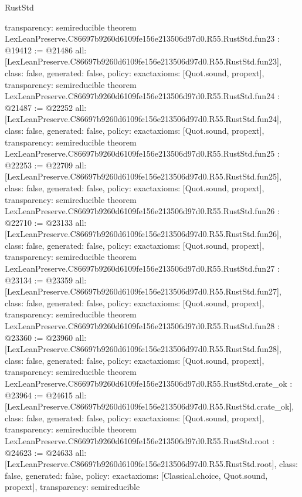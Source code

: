 \begin{lexlean}{RustStd}
\begin{coremodule}
{  transparency: semireducible
}
theorem LexLeanPreserve.C86697b9260d6109fe156e213506d97d0.R55.RustStd.fun23 : @19412 := @21486 {
  all: [LexLeanPreserve.C86697b9260d6109fe156e213506d97d0.R55.RustStd.fun23],
  class: false,
  generated: false,
  policy: exact{axioms: [Quot.sound, propext]},
  transparency: semireducible
}
theorem LexLeanPreserve.C86697b9260d6109fe156e213506d97d0.R55.RustStd.fun24 : @21487 := @22252 {
  all: [LexLeanPreserve.C86697b9260d6109fe156e213506d97d0.R55.RustStd.fun24],
  class: false,
  generated: false,
  policy: exact{axioms: [Quot.sound, propext]},
  transparency: semireducible
}
theorem LexLeanPreserve.C86697b9260d6109fe156e213506d97d0.R55.RustStd.fun25 : @22253 := @22709 {
  all: [LexLeanPreserve.C86697b9260d6109fe156e213506d97d0.R55.RustStd.fun25],
  class: false,
  generated: false,
  policy: exact{axioms: [Quot.sound, propext]},
  transparency: semireducible
}
theorem LexLeanPreserve.C86697b9260d6109fe156e213506d97d0.R55.RustStd.fun26 : @22710 := @23133 {
  all: [LexLeanPreserve.C86697b9260d6109fe156e213506d97d0.R55.RustStd.fun26],
  class: false,
  generated: false,
  policy: exact{axioms: [Quot.sound, propext]},
  transparency: semireducible
}
theorem LexLeanPreserve.C86697b9260d6109fe156e213506d97d0.R55.RustStd.fun27 : @23134 := @23359 {
  all: [LexLeanPreserve.C86697b9260d6109fe156e213506d97d0.R55.RustStd.fun27],
  class: false,
  generated: false,
  policy: exact{axioms: [Quot.sound, propext]},
  transparency: semireducible
}
theorem LexLeanPreserve.C86697b9260d6109fe156e213506d97d0.R55.RustStd.fun28 : @23360 := @23960 {
  all: [LexLeanPreserve.C86697b9260d6109fe156e213506d97d0.R55.RustStd.fun28],
  class: false,
  generated: false,
  policy: exact{axioms: [Quot.sound, propext]},
  transparency: semireducible
}
theorem LexLeanPreserve.C86697b9260d6109fe156e213506d97d0.R55.RustStd.crate_ok : @23964 := @24615 {
  all: [LexLeanPreserve.C86697b9260d6109fe156e213506d97d0.R55.RustStd.crate_ok],
  class: false,
  generated: false,
  policy: exact{axioms: [Quot.sound, propext]},
  transparency: semireducible
}
theorem LexLeanPreserve.C86697b9260d6109fe156e213506d97d0.R55.RustStd.root : @24623 := @24633 {
  all: [LexLeanPreserve.C86697b9260d6109fe156e213506d97d0.R55.RustStd.root],
  class: false,
  generated: false,
  policy: exact{axioms: [Classical.choice, Quot.sound, propext]},
  transparency: semireducible
}


\end{coremodule}
\end{lexlean}
